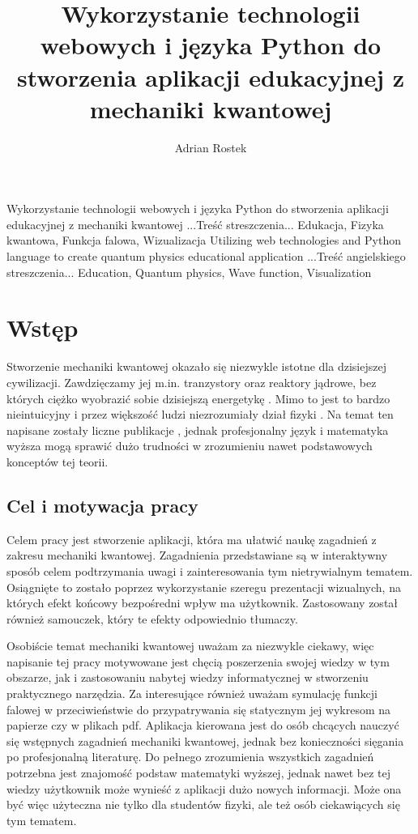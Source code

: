 \documentclass{SGGW-thesis}
\title{Wykorzystanie technologii webowych i języka Python do stworzenia aplikacji edukacyjnej z mechaniki kwantowej}
\author{Adrian Rostek}
\begin{document}
\maketitle
\statementpage
\abstractpage
{Wykorzystanie technologii webowych i języka Python do stworzenia aplikacji edukacyjnej z mechaniki kwantowej}
{...Treść streszczenia...}
{Edukacja, Fizyka kwantowa, Funkcja falowa, Wizualizacja}
{Utilizing web technologies and Python language to create quantum physics educational application}
{...Treść angielskiego streszczenia...}
{Education, Quantum physics, Wave function, Visualization}


{
  \doublespacing
  \tableofcontents
}

\startchapterfromoddpage %

\chapter{Wstęp}
Stworzenie mechaniki kwantowej okazało się niezwykle istotne dla dzisiejszej cywilizacji. Zawdzięczamy jej m.in. tranzystory oraz reaktory jądrowe, bez których ciężko wyobrazić sobie dzisiejszą energetykę \cite{nuclear-stats}. Mimo to jest to bardzo nieintuicyjny i przez większość ludzi niezrozumiały dział fizyki \cite{fiz atom}. Na temat ten napisane zostały liczne publikacje \cite{fiz atom} \cite{mechanika kwant} \cite{fiz kwant}, jednak profesjonalny język i matematyka wyższa mogą sprawić dużo trudności w zrozumieniu nawet podstawowych konceptów tej teorii.

	\section{Cel i motywacja pracy}
	Celem pracy jest stworzenie aplikacji, która ma ułatwić naukę zagadnień z zakresu mechaniki kwantowej. Zagadnienia przedstawiane są w interaktywny sposób celem podtrzymania uwagi i zainteresowania tym nietrywialnym tematem. Osiągnięte to zostało poprzez wykorzystanie szeregu prezentacji wizualnych, na których efekt końcowy bezpośredni wpływ ma użytkownik. Zastosowany został również samouczek, który te efekty odpowiednio tłumaczy.
	
	Osobiście temat mechaniki kwantowej uważam za niezwykle ciekawy, więc napisanie tej pracy motywowane jest chęcią poszerzenia swojej wiedzy w tym obszarze, jak i zastosowaniu nabytej wiedzy informatycznej w stworzeniu praktycznego narzędzia. Za interesujące również uważam symulację funkcji falowej w przeciwieństwie do przypatrywania się statycznym jej wykresom na papierze czy w plikach pdf. Aplikacja kierowana jest do osób chcących nauczyć się wstępnych zagadnień mechaniki kwantowej, jednak bez konieczności sięgania po profesjonalną literaturę. Do pełnego zrozumienia wszystkich zagadnień potrzebna jest znajomość podstaw matematyki wyższej, jednak nawet bez tej wiedzy użytkownik może wynieść z aplikacji dużo nowych informacji. Może ona być więc użyteczna nie tylko dla studentów fizyki, ale też osób ciekawiących się tym tematem.
\end{document}
